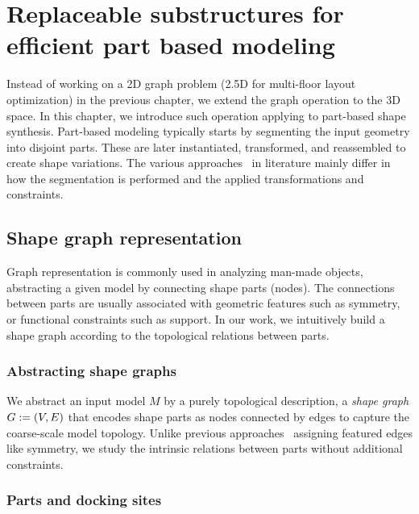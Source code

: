 
\chapter{Replaceable substructures for efficient part based modeling}
\label{chapter4}

Instead of working on a 2D graph problem (2.5D for multi-floor layout optimization) in the previous chapter, we extend the graph operation to the 3D space. In this chapter, we introduce such operation applying to part-based shape synthesis. Part-based modeling typically starts by segmenting the input geometry into disjoint parts. These are later instantiated, transformed, and reassembled to create shape variations. The various approaches~\cite{MitraSTAR2013} in literature mainly differ in how the segmentation is performed and the applied transformations and constraints.

\section{Shape graph representation}

Graph representation is commonly used in analyzing man-made objects, abstracting a given model by connecting shape parts (nodes). The connections between parts are usually associated with geometric features such as symmetry, or functional constraints such as support. In our work, we intuitively build a shape graph according to the topological relations between parts.

\subsection{Abstracting shape graphs}

We abstract an input model $M$ by a purely topological description, a \emph{shape graph} $G := (V,E)$ that encodes shape parts as nodes connected by edges to capture the coarse-scale model topology. Unlike previous approaches~\cite{wang_eg11,topoVarying14} assigning featured edges like symmetry, we study the intrinsic relations between parts without additional constraints.

\subsection{Parts and docking sites}

